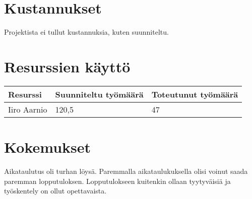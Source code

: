 \documentclass[a4paper, 12pt, finnish]{article}
\begin{document}
\section{Kustannukset}

\begin{adjustwidth}{0.25\textwidth}{}
    Projektista ei tullut kustannuksia, kuten suunniteltu.
\end{adjustwidth}

\section{Resurssien käyttö}

\begin{table}[htpb]
\centering
\label{tab:tyo}
\begin{tabular}{lll}
\textbf{Resurssi}                & \textbf{Suunniteltu työmäärä} & \textbf{Toteutunut työmäärä} \\ \hline
\multicolumn{1}{l|}{Iiro Aarnio} & 120,5                         & 47
\end{tabular}
\end{table}

\section{Kokemukset}

\begin{adjustwidth}{0.25\textwidth}{}
    Aikataulutus oli turhan löysä. Paremmalla aikataulukuksella olisi voinut saada paremman lopputuloksen. Lopputulokseen kuitenkin ollaan tyytyväisiä ja työskentely on ollut opettavaista.
\end{adjustwidth}
\end{document}
